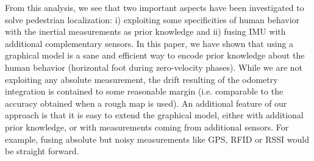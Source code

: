 From this analysis, we see that two important aspects have been investigated to solve pedestrian localization: i) exploiting some specificities of human behavior with the inertial measurements as prior knowledge and ii) fusing IMU with additional complementary sensors.
In this paper, we have shown that using a graphical model is a sane and efficient way to encode prior knowledge about the human behavior (horizontal foot during zero-velocity phases).
While we are not exploiting any absolute measurement, the drift resulting of the odometry integration is contained to some reasonable margin (i.e. comparable to the accuracy obtained when a rough map is used).
An additional feature of our approach is that it is easy to extend the graphical model, either with additional prior knowledge, or with measurements coming from additional sensors.
For example, fusing absolute but noisy measurements like GPS, RFID or RSSI would be straight forward.

